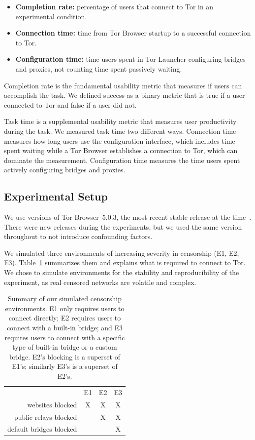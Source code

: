 \documentclass[USenglish,oneside,twocolumn]{article}
\begin{document}
\begin{itemize}
\item {\bfseries Completion rate:}  percentage of users that connect to Tor in an experimental condition. 
\item {\bfseries Connection time:} time from Tor Browser startup to a successful connection to Tor. 
\item {\bfseries Configuration time:} time users spent in Tor Launcher configuring bridges and proxies, not counting time spent passively waiting.
\end{itemize}

Completion rate is the fundamental usability metric that measures if users can accomplish the task. We defined success as a binary metric that is true if a user connected to Tor and false if a user did not. 

Task time is a supplemental usability metric that measures user productivity during the task. We measured task time two different ways. Connection time measures how long users use the configuration interface, which includes time  spent waiting while a Tor Browser establishes a connection to Tor, which can dominate the measurement. Configuration time measures the time users spent actively configuring bridges and proxies. 

\subsection{Experimental Setup}
\label{sec:environments}
We use versions of Tor Browser~5.0.3, 
the most recent stable release at the time~\cite{torbrowser-503}.
There were new releases during the experiments, but
we used the same version throughout to not introduce
confounding factors.

We simulated three environments of increasing severity in censorship (E1, E2, E3).
Table~\ref{tab:environments} summarizes them and explains what is required to connect to Tor. We chose to 
simulate environments for the stability and reproducibility of the 
experiment, as real censored networks are volatile and complex. 

\begin{table}[t]
\centering
\begin{tabular}{r c c c}
& E1 & E2 & E3 \\
websites blocked & X & X & X \\
public relays blocked & & X & X \\
default bridges blocked & & & X \\
\end{tabular}
\caption{
Summary of our simulated censorship environments.
E1 only requires users to connect directly;
E2 requires users to connect with a built-in bridge;
and E3 requires users to connect with a specific type of built-in bridge
or a custom bridge.
E2's blocking is a superset of E1's;
similarly E3's is a superset of E2's.
}
\label{tab:environments}
\end{table}
\end{document}

